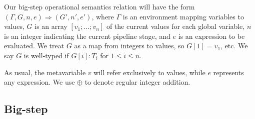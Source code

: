\documentclass{article}
\begin{document}
Our big-step operational semantics relation will have the form $(\Gamma, G, n, e) \Rightarrow (G', n', e')$, where $\Gamma$ is an environment mapping variables to values, $G$ is an array $[v_1; \dots; v_n]$ of the current values for each global variable, $n$ is an integer indicating the current pipeline stage, and $e$ is an expression to be evaluated. We treat $G$ as a map from integers to values, so $G[1] = v_1$, etc. We say $G$ is well-typed if $G[i] : T_i$ for $1 \leq i \leq n$.

As usual, the metavariable $v$ will refer exclusively to values, while $e$ represents any expression. We use $\oplus$ to denote regular integer addition.

\subsection*{Big-step}
\end{document}
